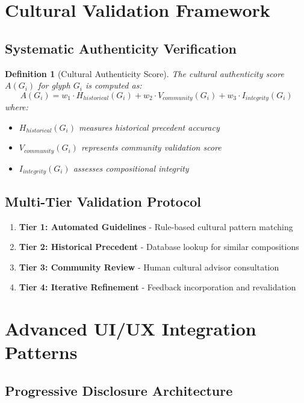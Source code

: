 \documentclass[12pt]{article}
\newtheorem{definition}{Definition}
\begin{document}
\section{Cultural Validation Framework}

\subsection{Systematic Authenticity Verification}

\begin{definition}[Cultural Authenticity Score]
The cultural authenticity score $A(G_i)$ for glyph $G_i$ is computed as:
\begin{equation}
A(G_i) = w_1 \cdot H_{historical}(G_i) + w_2 \cdot V_{community}(G_i) + w_3 \cdot I_{integrity}(G_i)
\end{equation}
where:
\begin{itemize}
    \item $H_{historical}(G_i)$ measures historical precedent accuracy
    \item $V_{community}(G_i)$ represents community validation score
    \item $I_{integrity}(G_i)$ assesses compositional integrity
\end{itemize}
\end{definition}

\subsection{Multi-Tier Validation Protocol}

\begin{enumerate}
    \item \textbf{Tier 1: Automated Guidelines} - Rule-based cultural pattern matching
    \item \textbf{Tier 2: Historical Precedent} - Database lookup for similar compositions  
    \item \textbf{Tier 3: Community Review} - Human cultural advisor consultation
    \item \textbf{Tier 4: Iterative Refinement} - Feedback incorporation and revalidation
\end{enumerate}

\section{Advanced UI/UX Integration Patterns}

\subsection{Progressive Disclosure Architecture}
\end{document}
